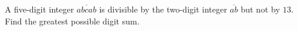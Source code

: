 A five-digit integer $\overline{abcab}$ is divisible by the two-digit integer $\overline{ab}$ but not by $13$. Find the greatest possible digit sum.
